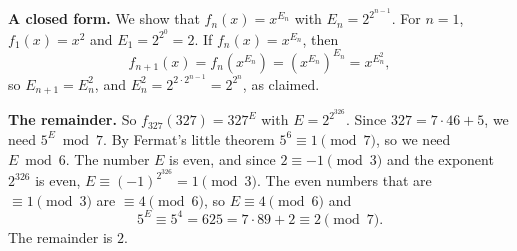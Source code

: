 \textbf{A closed form.} We show that $f_n(x)=x^{E_n}$ with $E_n=2^{2^{n-1}}$. For $n=1$, $f_1(x)=x^2$ and $E_1=2^{2^0}=2$. If $f_n(x)=x^{E_n}$, then
\[f_{n+1}(x)=f_n\left(x^{E_n}\right)=\left(x^{E_n}\right)^{E_n}=x^{E_n^2},\]
so $E_{n+1}=E_n^2$, and $E_n^2=2^{2\cdot2^{n-1}}=2^{2^n}$, as claimed.

\textbf{The remainder.} So $f_{327}(327)=327^{E}$ with $E=2^{2^{326}}$. Since $327=7\cdot46+5$, we need $5^E\bmod7$. By Fermat's little theorem $5^6\equiv1\pmod7$, so we need $E\bmod6$. The number $E$ is even, and since $2\equiv-1\pmod3$ and the exponent $2^{326}$ is even, $E\equiv(-1)^{2^{326}}=1\pmod3$. The even numbers that are $\equiv1\pmod3$ are $\equiv4\pmod6$, so $E\equiv4\pmod6$ and
\[5^E\equiv5^4=625=7\cdot89+2\equiv2\pmod7.\]
The remainder is $\boxed{2}$.
